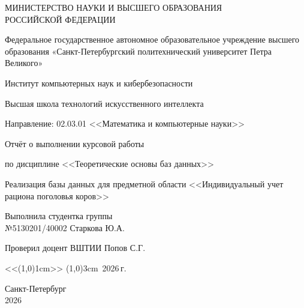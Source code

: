 \thispagestyle{empty} %

\begin{center}
    МИНИСТЕРСТВО НАУКИ И ВЫСШЕГО ОБРАЗОВАНИЯ\\ РОССИЙСКОЙ ФЕДЕРАЦИИ
    
    Федеральное государственное автономное образовательное учреждение высшего образования «Санкт-Петербургский политехнический университет Петра Великого»

    Институт компьютерных наук и кибербезопасности
    
    Высшая школа технологий искусственного интеллекта

    Направление: 02.03.01 <<Математика и компьютерные науки>>
    
    \vspace{5cm}
    {\Large
        Отчёт о выполнении курсовой работы
        
        по дисциплине <<Теоретические основы баз данных>> 
            
    Реализация базы данных для предметной области <<Индивидуальный учет рациона поголовья коров>>


    }
    \vspace{5cm}
    
    \begin{minipage}{\textwidth}
        Выполнила студентка группы \\
        №5130201/40002 \hfill Старкова Ю.А.
        
        \vspace{0.5cm}
        
        Проверил доцент ВШТИИ
 \hfill Попов С.Г.
    \end{minipage}
    
    \vspace{1cm}
    \hfill 
    <<\line(1,0){1cm}>> \line(1,0){3cm}\, 2026\,г.
    
    \vspace{3cm}
    Санкт-Петербург \\
    2026
\end{center}